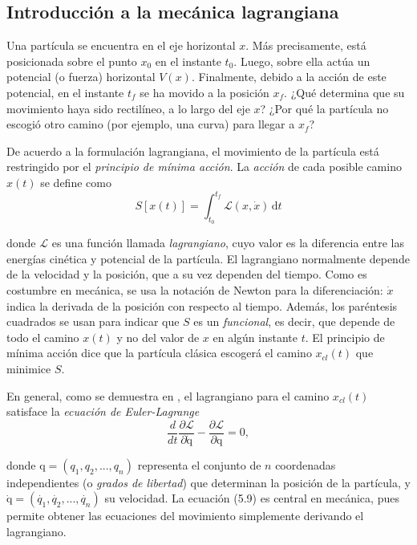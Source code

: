 \subsection{Introducción a la mecánica lagrangiana}

Una partícula se encuentra en el eje horizontal $x$. Más precisamente, está posicionada sobre el punto $x_0$ en el instante $t_0$. Luego, sobre ella actúa un potencial (o fuerza) horizontal $V(x)$. Finalmente, debido a la acción de este potencial, en el instante $t_f$ se ha movido a la posición $x_f$. ¿Qué determina que su movimiento haya sido rectilíneo, a lo largo del eje $x$? ¿Por qué la partícula no escogió otro camino (por ejemplo, una curva) para llegar a $x_f$?

De acuerdo a la formulación lagrangiana, el movimiento de la partícula está restringido por el \textit{principio de mínima acción}. La \textit{acción} de cada posible camino $x(t)$ se define como
\begin{equation}
S[x(t)] = \int_{t_0}^{t_f} \! \mathcal{L}(x, \dot{x}) \, \mathrm{d}t
\end{equation}

\noindent
donde $\mathcal{L}$ es una función llamada \textit{lagrangiano}, cuyo valor es la diferencia entre las energías cinética y potencial de la partícula. El lagrangiano normalmente depende de la velocidad y la posición, que a su vez dependen del tiempo. Como es costumbre en mecánica, se usa la notación de Newton para la diferenciación: $\dot{x}$ indica la derivada de la posición con respecto al tiempo. Además, los paréntesis cuadrados se usan para indicar que $S$ es un \textit{funcional}, es decir, que depende de todo el camino $x(t)$ y no del valor de $x$ en algún instante $t$. El principio de mínima acción dice que la partícula clásica escogerá el camino $x_{cl}(t)$ que minimice $S$.

En general, como se demuestra en \cite{shankar2012principles}, el lagrangiano para el camino $x_{cl}(t)$ satisface la \textit{ecuación de Euler-Lagrange}
\begin{equation}
\frac{d}{dt} \frac{\partial\mathcal{L}}{\partial \boldsymbol{\mathrm{\dot{q}}}} - \frac{\partial\mathcal{L}}{\partial\boldsymbol{\mathrm{q}}} = 0,
\end{equation}

\noindent
donde $\boldsymbol{\mathrm{q}} = (q_1, q_2,... ,q_n)$ representa el conjunto de $n$ coordenadas independientes (o \textit{grados de libertad}) que determinan la posición de la partícula, y $\boldsymbol{\mathrm{\dot{q}}} = (\dot{q_1}, \dot{q_2},... , \dot{q_n})$ su velocidad. La ecuación (5.9) es central en mecánica, pues permite obtener las ecuaciones del movimiento simplemente derivando el lagrangiano.

